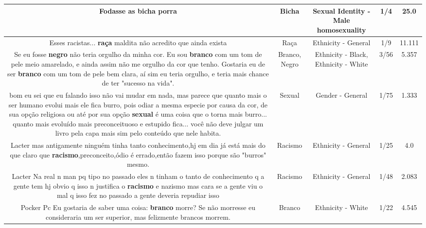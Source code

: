 \documentclass[11pt]{article}
\newlength\mylength
\begin{document}
\begin{center}
\begin{longtable}{|C{.65\mylength}|C{.30\mylength}|C{.12\mylength}|C{.12\mylength}|C{.12\mylength}|}
  \small Fodasse as \textbf{bicha} porra\normalsize   & Bicha & Sexual Identity - Male homosexuality & 1/4 & 25.0 \\  \hline
  \small Esses racistas... \textbf{raça} maldita não acredito que ainda exista\normalsize   & Raça & Ethnicity - General & 1/9 & 11.111 \\  \hline
  \small Se eu fosse \textbf{negro} não teria orgulho da minha cor. Eu sou \textbf{branco} com um tom de pele meio amarelado, e ainda assim não me orgulho da cor que tenho. Gostaria eu de ser \textbf{branco} com um tom de pele bem clara, aí sim eu teria orgulho, e teria mais chance de ter "sucesso na vida".\normalsize   & Branco, Negro & Ethnicity - Black, Ethnicity - White & 3/56 & 5.357 \\  \hline
  \small bom eu sei que eu falando isso não vai mudar em nada, mas parece que quanto mais o ser humano evolui mais ele fica burro, pois odiar a mesma especie por causa da cor, de sua opção religiosa ou até por sua opção \textbf{sexual} é uma coisa que o torna mais burro... quanto mais evoluído mais preconceituoso e estupido fica... você não deve julgar um livro pela capa mais sim pelo conteúdo que nele habita.\normalsize   & Sexual & Gender - General & 1/75 & 1.333 \\  \hline
  \small Lacter mas antigamente ninguém tinha tanto conhecimento,hj em dia já está mais do que claro que \textbf{racismo},preconceito,ódio é errado,então fazem isso porque são "burros" mesmo.\normalsize   & Racismo & Ethnicity - General & 1/25 & 4.0 \\  \hline
  \small Lacter Na real n man pq tipo no passado eles n tinham o tanto de conhecimento q a gente tem hj obvio q isso n justifica o \textbf{racismo} e nazismo mas cara se a gente viu o mal q isso fez no passado a gente deveria repudiar isso\normalsize   & Racismo & Ethnicity - General & 1/48 & 2.083 \\  \hline
  \small Pocker Pc Eu gostaria de saber uma coisa: \textbf{branco} morre? Se não morresse eu consideraria um ser superior, mas felizmente brancos morrem.\normalsize   & Branco & Ethnicity - White & 1/22 & 4.545 \\  \hline

\end{longtable}
\end{center}
\end{document}
